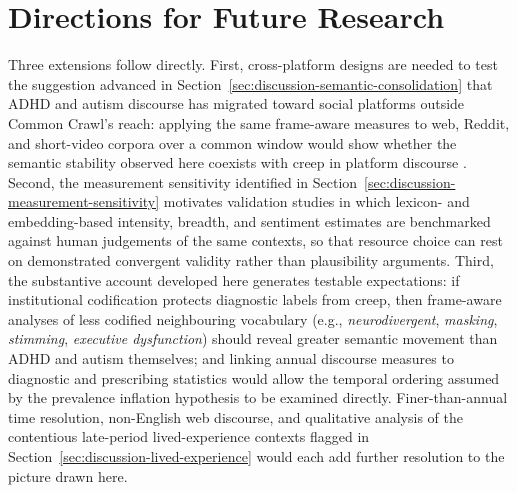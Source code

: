 \section{Directions for Future Research}
\label{sec:discussion-future-research}

Three extensions follow directly. First, cross-platform designs are needed to test the suggestion advanced in Section~\ref{sec:discussion-semantic-consolidation} that ADHD and autism discourse has migrated toward social platforms outside Common Crawl's reach: applying the same frame-aware measures to web, Reddit, and short-video corpora over a common window would show whether the semantic stability observed here coexists with creep in platform discourse \citep[cf.][]{devriesExploringConceptCreep2025,aragon-guevaraReachAccuracyInformation2025}. Second, the measurement sensitivity identified in Section~\ref{sec:discussion-measurement-sensitivity} motivates validation studies in which lexicon- and embedding-based intensity, breadth, and sentiment estimates are benchmarked against human judgements of the same contexts, so that resource choice can rest on demonstrated convergent validity rather than plausibility arguments. Third, the substantive account developed here generates testable expectations: if institutional codification protects diagnostic labels from creep, then frame-aware analyses of less codified neighbouring vocabulary (e.g., \emph{neurodivergent}, \emph{masking}, \emph{stimming}, \emph{executive dysfunction}) should reveal greater semantic movement than ADHD and autism themselves; and linking annual discourse measures to diagnostic and prescribing statistics would allow the temporal ordering assumed by the prevalence inflation hypothesis \citep{foulkesAreMentalHealth2023} to be examined directly. Finer-than-annual time resolution, non-English web discourse, and qualitative analysis of the contentious late-period lived-experience contexts flagged in Section~\ref{sec:discussion-lived-experience} would each add further resolution to the picture drawn here.
